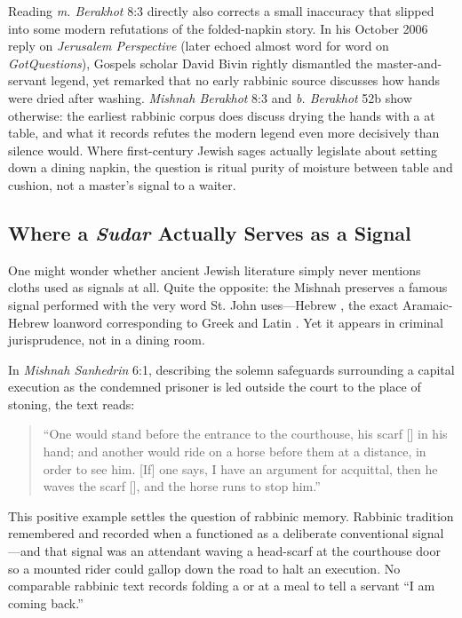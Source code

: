 Reading \emph{m. Berakhot} 8:3 directly also corrects a small inaccuracy that slipped into some modern refutations of the folded-napkin story. In his October 2006 reply on \emph{Jerusalem Perspective} (later echoed almost word for word on \emph{GotQuestions}), Gospels scholar David Bivin rightly dismantled the master-and-servant legend, yet remarked that no early rabbinic source discusses how hands were dried after washing. \emph{Mishnah Berakhot} 8:3 and \emph{b. Berakhot} 52b show otherwise: the earliest rabbinic corpus does discuss drying the hands with a  at table, and what it records refutes the modern legend even more decisively than silence would. Where first-century Jewish sages actually legislate about setting down a dining napkin, the question is ritual purity of moisture between table and cushion, not a master's signal to a waiter.

\subsection{Where a \emph{Sudar} Actually Serves as a Signal}

One might wonder whether ancient Jewish literature simply never mentions cloths used as signals at all. Quite the opposite: the Mishnah preserves a famous signal performed with the very word St. John uses---Hebrew , the exact Aramaic-Hebrew loanword corresponding to Greek  and Latin . Yet it appears in criminal jurisprudence, not in a dining room.

In \emph{Mishnah Sanhedrin} 6:1, describing the solemn safeguards surrounding a capital execution as the condemned prisoner is led outside the court to the place of stoning, the text reads:
\begin{quote}
``One would stand before the entrance to the courthouse, his scarf [] in his hand; and another would ride on a horse before them at a distance, in order to see him. [If] one says, I have an argument for acquittal, then he waves the scarf [], and the horse runs to stop him.''
\end{quote}
This positive example settles the question of rabbinic memory. Rabbinic tradition remembered and recorded when a  functioned as a deliberate conventional signal---and that signal was an attendant waving a head-scarf at the courthouse door so a mounted rider could gallop down the road to halt an execution. No comparable rabbinic text records folding a  or  at a meal to tell a servant ``I am coming back.''

